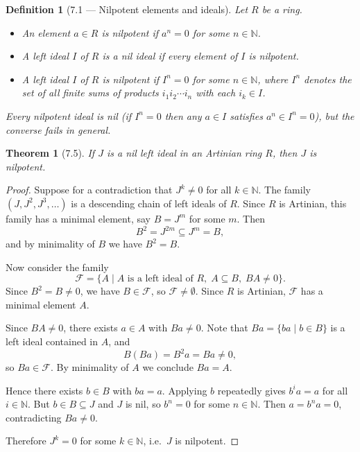 \documentclass[12pt]{article}
\newtheorem{theorem}{Theorem}
\newtheorem{definition}{Definition}
\begin{document}
\begin{definition}[7.1 — Nilpotent elements and ideals]
Let $R$ be a ring.
\begin{itemize}
  \item An element $a \in R$ is \emph{nilpotent} if $a^n = 0$ for some $n \in \mathbb{N}$.
  \item A left ideal $I$ of $R$ is a \emph{nil ideal} if every element of $I$ is nilpotent.
  \item A left ideal $I$ of $R$ is \emph{nilpotent} if $I^n = 0$ for some $n \in \mathbb{N}$, where $I^n$ denotes the set of all finite sums of products $i_1 i_2 \cdots i_n$ with each $i_k \in I$.
\end{itemize}
Every nilpotent ideal is nil (if $I^n = 0$ then any $a \in I$ satisfies $a^n \in I^n = 0$), but the converse fails in general.
\end{definition}

\begin{theorem}[7.5]
If $J$ is a nil left ideal in an Artinian ring $R$, then $J$ is nilpotent.
\end{theorem}

\begin{proof}
Suppose for a contradiction that $J^k \neq 0$ for all $k \in \mathbb{N}$. The family $(J, J^2, J^3, \ldots)$ is a descending chain of left ideals of $R$. Since $R$ is Artinian, this family has a minimal element, say $B = J^m$ for some $m$. Then
\[
  B^2 = J^{2m} \subseteq J^m = B,
\]
and by minimality of $B$ we have $B^2 = B$.

Now consider the family
\[
  \mathcal{F} = \{A \mid A \text{ is a left ideal of } R,\; A \subseteq B,\; BA \neq 0\}.
\]
Since $B^2 = B \neq 0$, we have $B \in \mathcal{F}$, so $\mathcal{F} \neq \emptyset$. Since $R$ is Artinian, $\mathcal{F}$ has a minimal element $A$.

Since $BA \neq 0$, there exists $a \in A$ with $Ba \neq 0$. Note that $Ba = \{ba \mid b \in B\}$ is a left ideal contained in $A$, and
\[
  B(Ba) = B^2 a = Ba \neq 0,
\]
so $Ba \in \mathcal{F}$. By minimality of $A$ we conclude $Ba = A$.

Hence there exists $b \in B$ with $ba = a$. Applying $b$ repeatedly gives $b^i a = a$ for all $i \in \mathbb{N}$. But $b \in B \subseteq J$ and $J$ is nil, so $b^n = 0$ for some $n \in \mathbb{N}$. Then $a = b^n a = 0$, contradicting $Ba \neq 0$.

Therefore $J^k = 0$ for some $k \in \mathbb{N}$, i.e.\ $J$ is nilpotent.
\end{proof}
\end{document}
